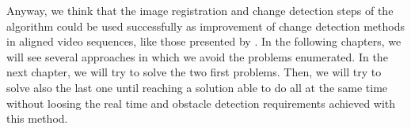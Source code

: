 Anyway, we think that the image registration and change detection steps of the algorithm could be used successfully as improvement of change detection methods in aligned video sequences, like those presented by \cite{diego2011video, evangelidis2011slice, evangelidis2011efficient}. In the following chapters, we will see several approaches in which we avoid the problems enumerated. In the next chapter, we will try to solve the two first problems. Then, we will try to solve also the last one until reaching a solution able to do all at the same time without loosing the real time and obstacle detection requirements achieved with this method.
























